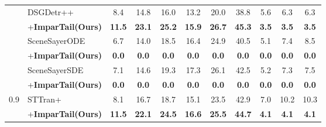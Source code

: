 \begin{table}[!h]
{\begin{tabular}{l|l|ccccccccc}
          \cmidrule(lr){3-11} 
        &        DSGDetr++~\cite{peddi_et_al_scene_sayer_2024} & 8.4 & 14.8 & 16.0 & 13.2 & 20.0 & 38.8 & 5.6 & 6.3 & 6.3  \\ 
        &        \quad+\textbf{ImparTail(Ours)} & \cellcolor{highlightColor} \textbf{11.5} & \cellcolor{highlightColor} \textbf{23.1} & \cellcolor{highlightColor} \textbf{25.2} & \cellcolor{highlightColor} \textbf{15.9} & \cellcolor{highlightColor} \textbf{26.7} & \cellcolor{highlightColor} \textbf{45.3} & \cellcolor{highlightColor} \textbf{3.5} & \cellcolor{highlightColor} \textbf{3.5} & \cellcolor{highlightColor} \textbf{3.5}  \\ 
          \cmidrule(lr){3-11} 
        &        SceneSayerODE~\cite{peddi_et_al_scene_sayer_2024} & 6.7 & 14.0 & 18.5 & 16.4 & 24.9 & 40.5 & 5.1 & 7.4 & 8.5  \\ 
        &        \quad+\textbf{ImparTail(Ours)} & \cellcolor{highlightColor} \textbf{0.0} & \cellcolor{highlightColor} \textbf{0.0} & \cellcolor{highlightColor} \textbf{0.0} & \cellcolor{highlightColor} \textbf{0.0} & \cellcolor{highlightColor} \textbf{0.0} & \cellcolor{highlightColor} \textbf{0.0} & \cellcolor{highlightColor} \textbf{0.0} & \cellcolor{highlightColor} \textbf{0.0} & \cellcolor{highlightColor} \textbf{0.0}  \\ 
          \cmidrule(lr){3-11} 
        &        SceneSayerSDE~\cite{peddi_et_al_scene_sayer_2024} & 7.1 & 14.6 & 19.3 & 17.3 & 26.1 & 42.5 & 5.2 & 7.3 & 7.5  \\ 
        &        \quad+\textbf{ImparTail(Ours)} & \cellcolor{highlightColor} \textbf{0.0} & \cellcolor{highlightColor} \textbf{0.0} & \cellcolor{highlightColor} \textbf{0.0} & \cellcolor{highlightColor} \textbf{0.0} & \cellcolor{highlightColor} \textbf{0.0} & \cellcolor{highlightColor} \textbf{0.0} & \cellcolor{highlightColor} \textbf{0.0} & \cellcolor{highlightColor} \textbf{0.0} & \cellcolor{highlightColor} \textbf{0.0}  \\ 
          \cmidrule(lr){3-11} 
        \multirow{12}{*}{0.9} &        STTran+~\cite{peddi_et_al_scene_sayer_2024} & 8.1 & 16.7 & 18.7 & 15.1 & 23.5 & 42.9 & 7.0 & 10.2 & 10.3  \\ 
        &        \quad+\textbf{ImparTail(Ours)} & \cellcolor{highlightColor} \textbf{11.5} & \cellcolor{highlightColor} \textbf{22.1} & \cellcolor{highlightColor} \textbf{24.5} & \cellcolor{highlightColor} \textbf{16.6} & \cellcolor{highlightColor} \textbf{25.5} & \cellcolor{highlightColor} \textbf{44.7} & \cellcolor{highlightColor} \textbf{4.1} & \cellcolor{highlightColor} \textbf{4.1} & \cellcolor{highlightColor} \textbf{4.1}  \\ 

\end{tabular}}
\end{table}
